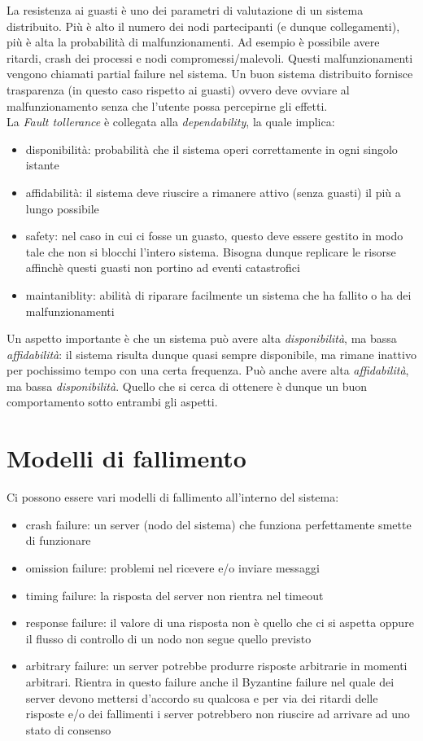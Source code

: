 La resistenza ai guasti è uno dei parametri di valutazione di un sistema distribuito. Più è alto il numero dei nodi partecipanti (e dunque collegamenti), più è alta la probabilità di malfunzionamenti. Ad esempio è possibile avere ritardi, crash dei processi e nodi compromessi/malevoli. Questi malfunzionamenti vengono chiamati partial failure nel sistema. Un buon sistema distribuito fornisce trasparenza (in questo caso rispetto ai guasti) ovvero deve ovviare al malfunzionamento senza che l'utente possa percepirne gli effetti. \\

La \textit{Fault tollerance} è collegata alla \textit{dependability}, la quale implica:
\begin{itemize}
    \item disponibilità: probabilità che il sistema operi correttamente in ogni singolo istante
    \item affidabilità: il sistema deve riuscire a rimanere attivo (senza guasti) il più a lungo possibile
    \item safety: nel caso in cui ci fosse un guasto, questo deve essere gestito in modo tale che non si blocchi l'intero sistema. Bisogna dunque replicare le risorse affinchè questi guasti non portino ad eventi catastrofici
    \item maintaniblity: abilità di riparare facilmente un sistema che ha fallito o ha dei malfunzionamenti
\end{itemize}

Un aspetto importante è che un sistema può avere alta \textit{disponibilità}, ma bassa \textit{affidabilità}: il sistema risulta dunque quasi sempre disponibile, ma rimane inattivo per pochissimo tempo con una certa frequenza. Può anche avere alta \textit{affidabilità}, ma bassa \textit{disponibilità}. Quello che si cerca di ottenere è dunque un buon comportamento sotto entrambi gli aspetti.

\newpage
\section{Modelli di fallimento}
Ci possono essere vari modelli di fallimento all'interno del sistema:
\begin{itemize}
    \item crash failure: un server (nodo del sistema) che funziona perfettamente smette di funzionare
    \item omission failure: problemi nel ricevere e/o inviare messaggi 
    \item timing failure: la risposta del server non rientra nel timeout
    \item response failure: il valore di una risposta non è quello che ci si aspetta oppure il flusso di controllo di un nodo non segue quello previsto
    \item arbitrary failure: un server potrebbe produrre risposte arbitrarie in momenti arbitrari. Rientra in questo failure anche il Byzantine failure nel quale dei server devono mettersi d'accordo su qualcosa e per via dei ritardi delle risposte e/o dei fallimenti i server potrebbero non riuscire ad arrivare ad uno stato di consenso 
\end{itemize}

